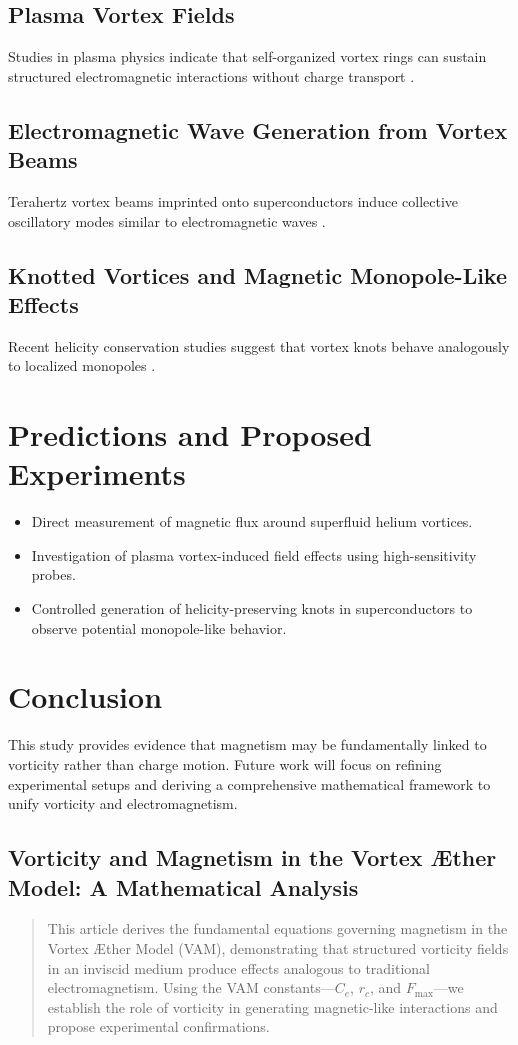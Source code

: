 \subsection{Plasma Vortex Fields}
Studies in plasma physics indicate that self-organized vortex rings can sustain structured electromagnetic interactions without charge transport \cite{plasma_vortex_flows}.

\subsection{Electromagnetic Wave Generation from Vortex Beams}
Terahertz vortex beams imprinted onto superconductors induce collective oscillatory modes similar to electromagnetic waves \cite{higgs_waves_vortex}.

\subsection{Knotted Vortices and Magnetic Monopole-Like Effects}
Recent helicity conservation studies suggest that vortex knots behave analogously to localized monopoles \cite{collected_helicity_papers}.

\section{Predictions and Proposed Experiments}
\begin{itemize}
    \item Direct measurement of magnetic flux around superfluid helium vortices.
    \item Investigation of plasma vortex-induced field effects using high-sensitivity probes.
    \item Controlled generation of helicity-preserving knots in superconductors to observe potential monopole-like behavior.
\end{itemize}

\section{Conclusion}
This study provides evidence that magnetism may be fundamentally linked to vorticity rather than charge motion. Future work will focus on refining experimental setups and deriving a comprehensive mathematical framework to unify vorticity and electromagnetism.



\subsection{Vorticity and Magnetism in the Vortex \AE ther Model: A Mathematical Analysis}
    \begin{abstract}
        This article derives the fundamental equations governing magnetism in the Vortex \AE ther Model (VAM), demonstrating that structured vorticity fields in an inviscid medium produce effects analogous to traditional electromagnetism. Using the VAM constants—$C_e$, $r_c$, and $F_{\text{max}}$—we establish the role of vorticity in generating magnetic-like interactions and propose experimental confirmations.
    \end{abstract}

